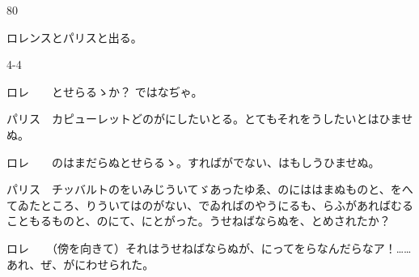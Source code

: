 \documentclass[tate,paper=b6j,jafontsize=9pt]{jlreq}
\begin{document}


\begin{azconvIndented}{8\zw}{0\zw}

ロレンスとパリスと出る。

\end{azconvIndented}
\begin{azconvIndented}{4\zw}{-4\zw}

ロレ　　とせらるゝか？ ではなぢゃ。

パリス　カピューレットどのがにしたいとる。とてもそれをうしたいとはひませぬ。

ロレ　　のはまだらぬとせらるゝ。すればがでない、はもしうひませぬ。

パリス　チッバルトのをいみじういてゞあったゆゑ、のにははまぬものと、をへてゐたところ、りういてはのがない、でゐればのやうにるも、らふがあればむることもるものと、のにて、にとがった。うせねばならぬを、とめされたか？

ロレ　　（傍を向きて）それはうせねばならぬが、にってをらなんだらなア！……あれ、ぜ、がにわせられた。

\end{azconvIndented}
\end{document}
